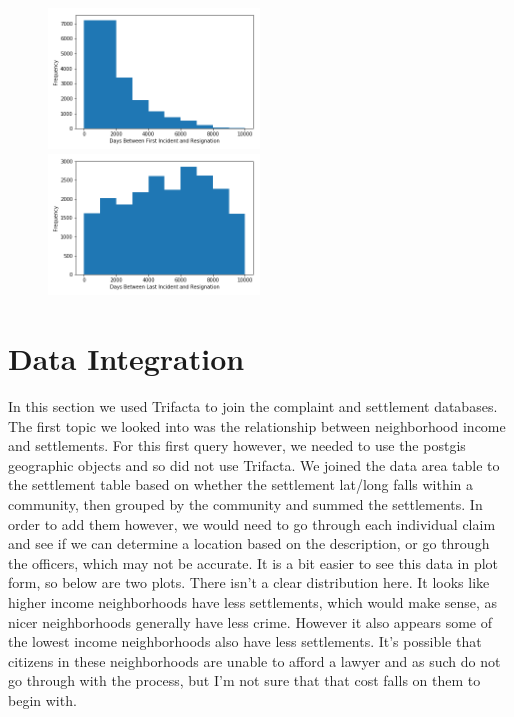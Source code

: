 \documentclass[11pt]{article}
\begin{document}
\begin{figure}[h!]
\includegraphics[width=0.5\textwidth]{complaint2.png}
\includegraphics[width=0.5\textwidth]{complaint3.png}
\end{figure}

\FloatBarrier
\section{Data Integration}

In this section we used Trifacta to join the complaint and settlement databases. The first topic we looked into was the relationship between neighborhood income and settlements. For this first query however, we needed to use the postgis geographic objects and so did not use Trifacta. We joined the data area table to the settlement table based on whether the settlement lat/long falls within a community, then grouped by the community and summed the settlements. In order to add them however, we would need to go through each individual claim and see if we can determine a location based on the description, or go through the officers, which may not be accurate. It is a bit easier to see this data in plot form, so below are two plots. There isn't a clear distribution here. It looks like higher income neighborhoods have less settlements, which would make sense, as nicer neighborhoods generally have less crime. However it also appears some of the lowest income neighborhoods
also have less settlements. It's possible that citizens in these neighborhoods are unable to afford a lawyer and as such do not go through with the process, but I'm not sure that that cost falls on them to begin with.
\end{document}

